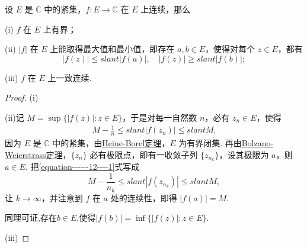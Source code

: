 \documentclass[../../main.tex]{subfiles}
\begin{document}
\begin{theorem}\label{theorem:连续的复变函数在紧集上的性质}
设 $E$ 是 $\mathbb{C}$ 中的紧集，$f: E \to \mathbb{C}$ 在 $E$ 上连续，那么

(i) $f$ 在 $E$ 上有界；

(ii) $|f|$ 在 $E$ 上能取得最大值和最小值，即存在 $a, b \in E$，使得对每个 $z \in E$，都有
\[
|f(z)| \leqslant slant |f(a)|, \quad |f(z)| \geqslant slant |f(b)|;
\]

(iii) $f$ 在 $E$ 上一致连续.
\end{theorem}
\begin{proof}
(i)

(ii)记 $M = \sup\{|f(z)|: z \in E\}$，于是对每一自然数 $n$，必有 $z_n \in E$，使得
\begin{align}\label{equation------12----1}
M - \frac{1}{n} \leqslant slant |f(z_n)| \leqslant slant M.
\end{align}
因为 $E$ 是 $\mathbb{C}$ 中的紧集，由\hyperref[theorem:Heine-Borel定理]{Heine-Borel定理}，$E$ 为有界闭集. 再由\hyperref[theorem:Bolzano-Weierstrass定理]{Bolzano-Weierstrass定理}，$\{z_n\}$ 必有极限点，即有一收敛子列 $\{z_{n_k}\}$，设其极限为 $a$，则 $a \in E$. 把\eqref{equation------12----1}式写成
\[
M - \frac{1}{n_k} \leqslant slant |f(z_{n_k})| \leqslant slant M,
\]
让 $k \to \infty$，并注意到 $f$ 在 $a$ 处的连续性，即得 $|f(a)| = M$. 

同理可证,存在$b\in E$,使得$|f(b)|=\inf\{|f(z)|:z\in E\}.$

(iii)
\end{proof}
\end{document}
